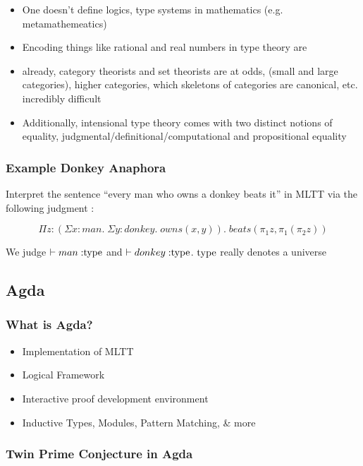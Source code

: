 \documentclass{beamer}
\begin{document}
\begin{frame}

\begin{itemize}
\item One doesn't define logics, type systems in mathematics (e.g. metamathemeatics)
\item Encoding things like rational and real numbers in type theory are
\item already, category theorists and set theorists are at odds, (small and
  large categories), higher categories, which skeletons of categories are canonical, etc.
  incredibly difficult
\item Additionally, intensional type theory comes with two distinct notions of
  equality, judgmental/definitional/computational and propositional equality
\end{itemize}  
\end{frame}

\begin{frame}

\frametitle{Example Donkey Anaphora}
  
Interpret the sentence ``every man who owns a donkey beats it'' in MLTT via the following judgment :

\[\Pi z : (\Sigma x : man. \; \Sigma y : donkey. \; owns(x,y)). \;
  beats(\pi_1z,\pi_1(\pi_2z))\] 

We judge $\vdash man \; {:} {\rm type}$ and $\vdash donkey \; {:}
{\rm type}$. ${\rm type}$ really denotes a universe

\end{frame}

\subsection{Agda}

\begin{frame}
\frametitle{What is Agda?}

\begin{itemize}
\item Implementation of MLTT
\item Logical Framework
\item Interactive proof development environment
\item Inductive Types, Modules, Pattern Matching, & more
\end{itemize}

\end{frame}

\begin{frame}

\frametitle{Twin Prime Conjecture in Agda}



\end{frame}
\end{document}
